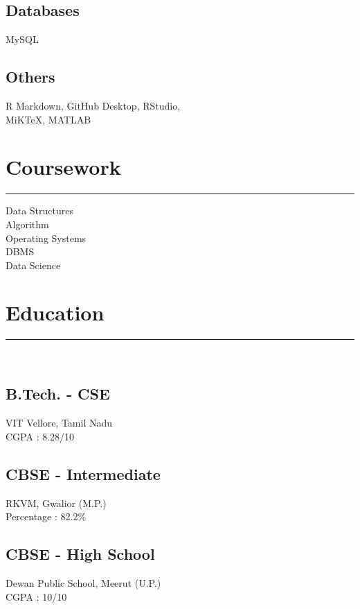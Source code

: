 \documentclass[]{meetresume-class}
\begin{document}
\begin{minipage}[t]{0.33\textwidth}
		\subsection{Databases}
		MySQL%
		\vspace{6pt}
		
		\subsection{Others}
		R Markdown, GitHub Desktop, RStudio,\\
		MiKTeX, MATLAB
		\sectionsep
		\section{Coursework}
		\noindent\rule{5cm}{0.6pt}
		
		Data Structures\\
		Algorithm\\
		Operating Systems\\
		DBMS\\
		Data Science
		\sectionsep
		\section{Education} 
		\noindent\rule{5cm}{0.6pt}\\
		\subsection{B.Tech. - CSE}
		VIT Vellore, Tamil Nadu \\
		CGPA : 8.28/10\\
		\vspace{8pt}
		\subsection{CBSE - Intermediate}
		RKVM, Gwalior (M.P.)\\
		Percentage : 82.2\%\\
		\vspace{8pt}
		\subsection{CBSE - High School}
		Dewan Public School, Meerut (U.P.)\\
		CGPA : 10/10
		\sectionsep

\end{minipage}
\end{document}
